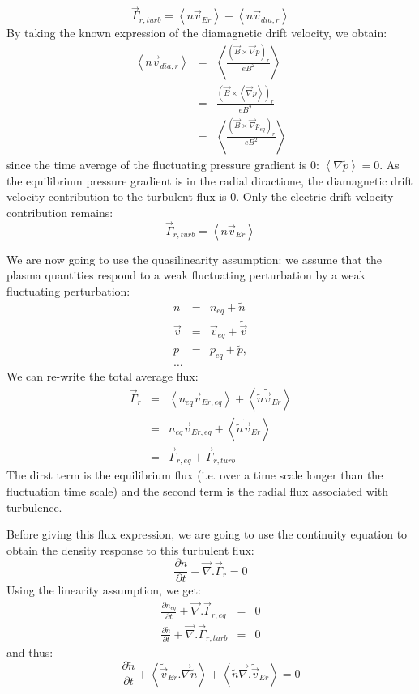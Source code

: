 \[
		\vec{\Gamma}_{r,turb} = \left< n \vec{v}_{Er} \right> + \left< n \vec{v}_{dia,r} \right>
\]
By taking the known expression of the diamagnetic drift velocity, we obtain:
\begin{eqnarray*}
		\left< n \vec{v}_{dia,r} \right>	&	=	&	\left< \frac{\left(\vec{B} \times \vec{\nabla}p \right)_r}{eB^2} \right>			\\
																			&	=	&	\frac{ \left( \vec{B} \times \left< \vec{\nabla}p \right> \right)_r }{eB^2}		\\
																			&	=	&	\left< \frac{\left(\vec{B} \times \vec{\nabla}p_{eq} \right)_r}{eB^2} \right>
\end{eqnarray*}
since the time average of the fluctuating pressure gradient is 0: $\left< \nabla \tilde{p} \right> = 0$. As the equilibrium pressure gradient is in the radial diractione, the diamagnetic drift velocity contribution to the turbulent flux is 0. Only the electric drift velocity contribution remains:
\[
		\vec{\Gamma}_{r,turb} = \left< n \vec{v}_{Er} \right>
\]

We are now going to use the quasilinearity assumption: we assume that the plasma quantities respond to a weak fluctuating perturbation by a weak fluctuating perturbation:
\begin{eqnarray*}
		n	&	=	&	n_{eq} + \tilde{n}		\\
		\vec{v}	&	=	&	\vec{v}_{eq} + \tilde{\vec{v}}		\\
		p	&	=	&	p_{eq} + \tilde{p},		\\
		\ldots	&	&
\end{eqnarray*}
We can re-write the total average flux:
\begin{eqnarray*}
		\vec{\Gamma}_r	&	=	&	\left< n_{eq} \vec{v}_{Er,eq} \right> + \left< \tilde{n} \tilde{\vec{v}}_{Er} \right>	\\
											&	=	&	n_{eq} \vec{v}_{Er,eq} + \left< \tilde{n} \tilde{\vec{v}}_{Er} \right>		\\
											&	=	&	\vec{\Gamma}_{r,eq} + \vec{\Gamma}_{r,turb}
\end{eqnarray*}
The dirst term is the equilibrium flux (i.e. over a time scale longer than the fluctuation time scale) and the second term is the radial flux associated with turbulence.

Before giving this flux expression, we are going to use the continuity equation to obtain the density response to this turbulent flux:
\[ 
		\frac{\partial n}{\partial t} + \vec{\nabla}.\vec{\Gamma}_r = 0
\]
Using the linearity assumption, we get:
\begin{eqnarray*}
		\frac{\partial n_{eq}}{\partial t} + \vec{\nabla}.\vec{\Gamma}_{r,eq} & = & 0		\\
		\frac{\partial \tilde{n}}{\partial t} + \vec{\nabla}.\vec{\Gamma}_{r,turb} & = & 0
\end{eqnarray*}
and thus:
\[
		\frac{\partial \tilde{n}}{\partial t} + \left< \tilde{\vec{v}}_{Er}. \vec{\nabla} \tilde{n} \right> + \left< \tilde{n} \vec{\nabla}. \tilde{\vec{v}}_{Er} \right> = 0
\]

